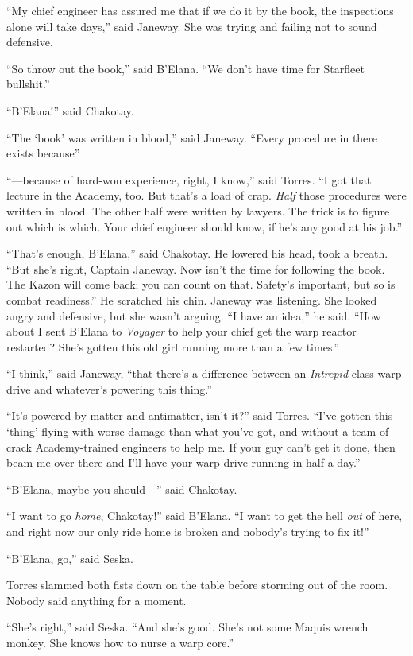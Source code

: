 \documentclass[twoside,letterpaper,12pt]{memoir}
\begin{document}
``My chief engineer has assured me that if we do it by the book, the inspections alone will take days,'' said Janeway. She was trying and failing not to sound defensive.

``So throw out the book,'' said B'Elana. ``We don't have time for Starfleet bullshit.''

``B'Elana!'' said Chakotay.

``The `book' was written in blood,'' said Janeway. ``Every procedure in there exists because\Emdash''

``---because of hard-won experience, right, I know,'' said Torres. ``I got that lecture in the Academy, too. But that's a load of crap. \textit{Half} those procedures were written in blood. The other half were written by lawyers. The trick is to figure out which is which. Your chief engineer should know, if he’s any good at his job.''

``That's enough, B'Elana,'' said Chakotay. He lowered his head, took a breath. ``But she's right, Captain Janeway. Now isn't the time for following the book. The Kazon will come back; you can count on that. Safety's important, but so is combat readiness.'' He scratched his chin. Janeway was listening. She looked angry and defensive, but she wasn't arguing. ``I have an idea,'' he said. ``How about I sent B'Elana to \textit{Voyager} to help your chief get the warp reactor restarted? She's gotten this old girl running more than a few times.''

``I think,'' said Janeway, ``that there's a difference between an \textit{Intrepid}-class warp drive and whatever's powering this thing.''

``It's powered by matter and antimatter, isn't it?'' said Torres. ``I've gotten this `thing' flying with worse damage than what you've got, and without a team of crack Academy-trained engineers to help me. If your guy can't get it done, then beam me over there and I'll have your warp drive running in half a day.''

``B'Elana, maybe you should---'' said Chakotay.

``I want to go \textit{home}, Chakotay!'' said B'Elana. ``I want to get the hell \textit{out} of here, and right now our only ride home is broken and nobody's trying to fix it!''

``B'Elana, go,'' said Seska.

Torres slammed both fists down on the table before storming out of the room. Nobody said anything for a moment.

``She's right,'' said Seska. ``And she's good. She's not some Maquis wrench monkey. She knows how to nurse a warp core.''
\end{document}
